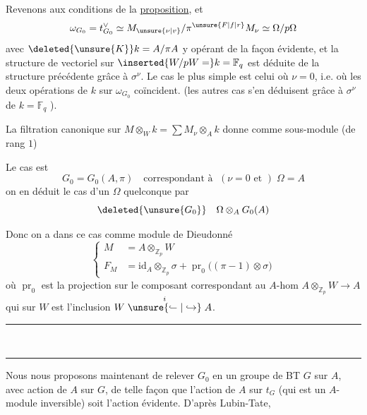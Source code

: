Revenons aux conditions de la \uline{proposition}, et 
\[
\omega_{G_0}=t_{G_0}^{\vee}\simeq M_{\unsure{\nu|v}}/\pi^{\unsure{F|f|r}}M_\nu\simeq \Omega/p\Omega
\]
avec $\deleted{\unsure{K}}k=A/\pi A$ y opérant de la façon évidente, et la structure de vectoriel sur $\inserted{W/pW=}k=\mathbb F_q$ est déduite de la structure précédente grâce à $\sigma^\nu$. Le cas le plus simple est celui où $\nu=0$, i.e. où  les deux opérations de $k$ sur $\omega_{G_0}$ coïncident.  (les autres cas s'en déduisent grâce à  $\sigma^\nu$ de $k=\mathbb F_q$ ).

La filtration canonique sur $M\otimes_W k=\sum M_\nu\otimes_A k$ donne comme sous-module (de rang $1$)  

Le cas  est
\[
G_0=G_0(A,\pi)\quad\text{correspondant à }\;(\nu=0\text{ et })\;\Omega=A
\]
on en déduit le cas d'un $\Omega$ quelconque par
\[
\deleted{\unsure{G_0}}\quad\Omega\otimes_A G_0(A)
\]

Donc on a dans ce cas comme module de Dieudonné
\[
\left\{\begin{aligned}
M&=A\otimes_{\mathbb Z_p}W\\
F_M&=\mathrm{id}_A\otimes_{\mathbb Z_p}\sigma+\operatorname{pr}_0\bigl((\pi-1)\otimes\sigma\bigr)
\end{aligned}\right.
\]
où $\operatorname{pr}_0$ est la projection sur le composant correspondant au $A$-hom $A\otimes_{\mathbb Z_p}W\longrightarrow A$ qui sur $W$ est l'inclusion $W\mathrel{\overset{i}{\unsure{\lhook\joinrel\relbar|\hookrightarrow}}}A$.

\begin{center}\rule{2.2em}{0.3pt}\\[-4pt]\rule{1.2em}{0.3pt}\end{center}

Nous nous proposons maintenant de relever $G_0$  en un groupe de BT $G$ sur $A$,  avec action de $A$ sur $G$, de telle façon que l'action de $A$ sur $t_G$ (qui est un $A$-module inversible) soit l'action évidente. D'après Lubin-Tate,
